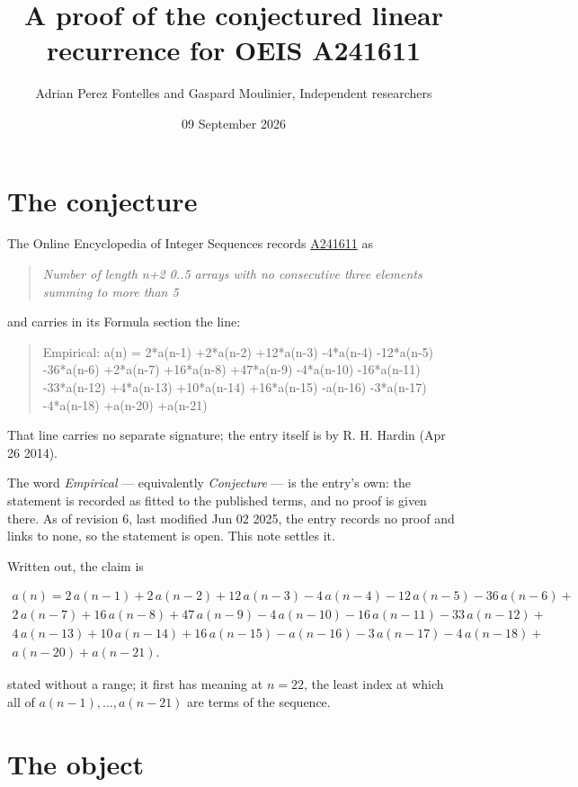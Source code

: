 \documentclass[11pt]{article}
\title{A proof of the conjectured linear recurrence for OEIS A241611}
\author{Adrian Perez Fontelles and Gaspard Moulinier, Independent researchers}
\date{09 September 2026}
\theoremstyle{definition}
\begin{document}
\maketitle
\section{The conjecture}

The Online Encyclopedia of Integer Sequences records \href{https://oeis.org/A241611}{A241611} as

\begin{quote}\itshape Number of length n+2 0..5 arrays with no consecutive three elements summing to more than 5\end{quote}

and carries in its Formula section the line:

\begin{quote}\ttfamily Empirical: a(n) = 2*a(n-1) +2*a(n-2) +12*a(n-3) -4*a(n-4) -12*a(n-5) -36*a(n-6) +2*a(n-7) +16*a(n-8) +47*a(n-9) -4*a(n-10) -16*a(n-11) -33*a(n-12) +4*a(n-13) +10*a(n-14) +16*a(n-15) -a(n-16) -3*a(n-17) -4*a(n-18) +a(n-20) +a(n-21)\end{quote}

That line carries no separate signature; the entry itself is by R. H. Hardin (Apr 26 2014).

The word {\itshape Empirical} --- equivalently {\itshape Conjecture} --- is the entry's own: the statement is recorded as fitted to the published terms, and no proof is given there. As of revision 6, last modified Jun 02 2025, the entry records no proof and links to none, so the statement is open. This note settles it.

Written out, the claim is

\begin{multline*} a(n) = 2\,a(n-1) + 2\,a(n-2) + 12\,a(n-3) - 4\,a(n-4) - 12\,a(n-5) - 36\,a(n-6) + \\ 2\,a(n-7) + 16\,a(n-8) + 47\,a(n-9) - 4\,a(n-10) - 16\,a(n-11) - 33\,a(n-12) + \\ 4\,a(n-13) + 10\,a(n-14) + 16\,a(n-15) - a(n-16) - 3\,a(n-17) - 4\,a(n-18) + \\ a(n-20) + a(n-21). \end{multline*}

stated without a range; it first has meaning at $n = 22$, the least index at which all of $a(n-1),\dots,a(n-21)$ are terms of the sequence.

\section{The object}
\end{document}
